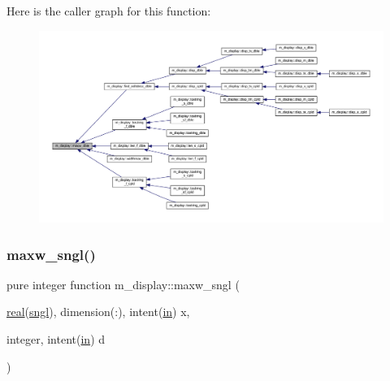 Here is the caller graph for this function\+:
\nopagebreak
\begin{figure}[H]
\begin{center}
\leavevmode
\includegraphics[width=350pt]{namespacem__display_a40bc69658b0fa714777f4b2b5477ee83_icgraph}
\end{center}
\end{figure}
\mbox{\label{namespacem__display_a7d542f36f022c67f2879318796f82e57}} 
\subsubsection{\texorpdfstring{maxw\+\_\+sngl()}{maxw\_sngl()}}
{\footnotesize\ttfamily pure integer function m\+\_\+display\+::maxw\+\_\+sngl (\begin{DoxyParamCaption}\item[{\hyperlink{read__watch_83_8txt_abdb62bde002f38ef75f810d3a905a823}{real}(\hyperlink{namespacem__display_a2ac86bc535c3ccc5947dbb3109c666b5}{sngl}), dimension(\+:), intent(\hyperlink{M__journal_83_8txt_afce72651d1eed785a2132bee863b2f38}{in})}]{x,  }\item[{integer, intent(\hyperlink{M__journal_83_8txt_afce72651d1eed785a2132bee863b2f38}{in})}]{d }\end{DoxyParamCaption})\hspace{0.3cm}{\ttfamily [private]}}

